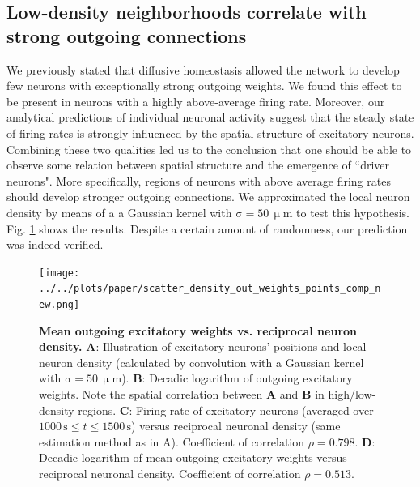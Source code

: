 \documentclass[10pt,letterpaper]{article}
\begin{document}
\subsection*{Low-density neighborhoods correlate with strong outgoing connections}
We previously stated that diffusive homeostasis allowed the network to develop few neurons with exceptionally strong outgoing weights. We found this effect to be present in neurons with a highly above-average firing rate. Moreover, our analytical predictions of individual neuronal activity suggest that the steady state of firing rates is strongly influenced by the spatial structure of excitatory neurons. Combining these two qualities led us to the conclusion that one should be able to observe some relation between spatial structure and the emergence of ``driver neurons". More specifically, regions of neurons with above average firing rates should develop stronger outgoing connections. We approximated the local neuron density by means of a a Gaussian kernel with $\mathrm{\sigma = 50\, \upmu m}$ to test this hypothesis. Fig. \ref{Inverse_Dens_vs_Sum_Out_Weights} shows the results. Despite a certain amount of randomness, our prediction was indeed verified. 
\begin{figure}
\texttt{[image: ../../plots/paper/scatter\_density\_out\_weights\_points\_comp\_new.png]}
\caption{{\bf Mean outgoing excitatory weights vs. reciprocal neuron density.} \textbf{A}: Illustration of excitatory neurons' positions and local neuron density (calculated by convolution with a Gaussian kernel with $\mathrm{\sigma = 50\, \upmu m}$). \textbf{B}: Decadic logarithm of outgoing excitatory weights. Note the spatial correlation between \textbf{A} and \textbf{B} in high/low-density regions. \textbf{C}: Firing rate of excitatory neurons (averaged over $\mathrm{ 1000\,s} \leq t \mathrm{\leq 1500\,s}$) versus reciprocal neuronal density (same estimation method as in A). Coefficient of correlation $\rho = 0.798$. \textbf{D}: Decadic logarithm of mean outgoing excitatory weights versus reciprocal neuronal density. Coefficient of correlation $\rho = 0.513$.}
\label{Inverse_Dens_vs_Sum_Out_Weights}
\end{figure}
\end{document}
